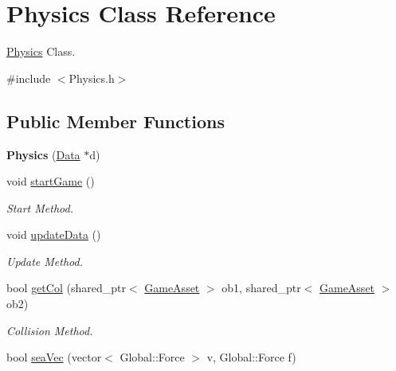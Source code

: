 \hypertarget{classPhysics}{\section{Physics Class Reference}
\label{classPhysics}
}


\hyperlink{classPhysics}{Physics} Class.  




{\ttfamily \#include $<$Physics.\-h$>$}

\subsection*{Public Member Functions}
\begin{DoxyCompactItemize}
\item 
\hypertarget{classPhysics_a4b8707330563fb1f9c7928e401f148fc}{{\bfseries Physics} (\hyperlink{classData}{Data} $\ast$d)}\label{classPhysics_a4b8707330563fb1f9c7928e401f148fc}

\item 
\hypertarget{classPhysics_a06548de8c46a0f5221a0489f99089ff4}{void \hyperlink{classPhysics_a06548de8c46a0f5221a0489f99089ff4}{start\-Game} ()}\label{classPhysics_a06548de8c46a0f5221a0489f99089ff4}

\begin{DoxyCompactList}\small\item\em Start Method. \end{DoxyCompactList}\item 
\hypertarget{classPhysics_a7fcfb97c9556a6ecb6d2753a7f54a5ed}{void \hyperlink{classPhysics_a7fcfb97c9556a6ecb6d2753a7f54a5ed}{update\-Data} ()}\label{classPhysics_a7fcfb97c9556a6ecb6d2753a7f54a5ed}

\begin{DoxyCompactList}\small\item\em Update Method. \end{DoxyCompactList}\item 
\hypertarget{classPhysics_a0de42b58ef325184c2d7680682e5e7f9}{bool \hyperlink{classPhysics_a0de42b58ef325184c2d7680682e5e7f9}{get\-Col} (shared\-\_\-ptr$<$ \hyperlink{classGameAsset}{Game\-Asset} $>$ ob1, shared\-\_\-ptr$<$ \hyperlink{classGameAsset}{Game\-Asset} $>$ ob2)}\label{classPhysics_a0de42b58ef325184c2d7680682e5e7f9}

\begin{DoxyCompactList}\small\item\em Collision Method. \end{DoxyCompactList}\item 
\hypertarget{classPhysics_ab91b6ab5e220174562c0186f335749d2}{bool \hyperlink{classPhysics_ab91b6ab5e220174562c0186f335749d2}{sea\-Vec} (vector$<$ Global\-::\-Force $>$ v, Global\-::\-Force f)}\label{classPhysics_ab91b6ab5e220174562c0186f335749d2}


\end{DoxyCompactItemize}
